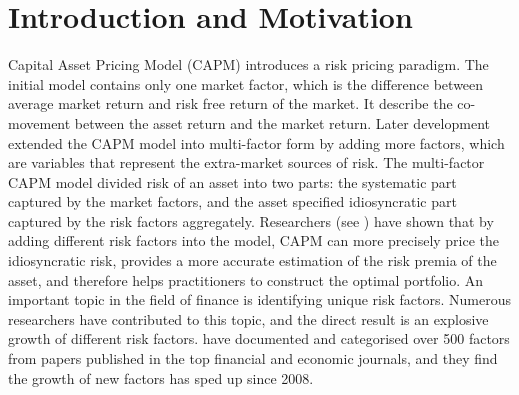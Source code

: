 \chapter{Introduction and Motivation}
Capital Asset Pricing Model (CAPM) \cite{Sharpe1964, Lintner1965, Black1972} introduces a risk pricing paradigm.
The initial model contains only one market factor, which is the difference between average market return and risk free return of the market.
It describe the co-movement between the asset return and the market return.
Later development extended the CAPM model into multi-factor form by adding more factors, which are variables that represent the extra-market sources of risk.
The multi-factor CAPM model divided risk of an asset into two parts: the systematic part captured by the market factors, and the asset specified idiosyncratic part captured by the risk factors aggregately.
Researchers (see ) have shown that by adding different risk factors into the model, CAPM can more precisely price the idiosyncratic risk, provides a more accurate estimation of the risk premia of the asset, and therefore helps practitioners to construct the optimal portfolio.
An important topic in the field of finance is identifying unique risk factors.
Numerous researchers have contributed to this topic, and the direct result is an explosive growth of different risk factors.
  have documented and categorised over 500 factors from papers published in the top financial and economic journals, and they find the growth of new factors has sped up since 2008. 
 
